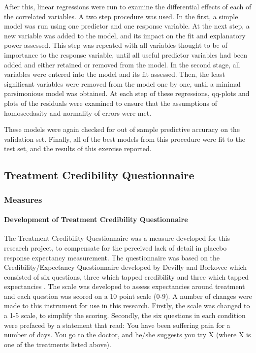After this, linear regressions were run to examine the differential effects of each of the correlated variables. A two step procedure was used. In the first, a simple model was run using one predictor and one response variable. At the next step, a new variable was added to the model, and its impact on the fit and explanatory power assessed. This step was repeated with all variables thought to be of importance to the response variable, until all useful predictor variables had been added and either retained or removed from the model. In the second stage, all variables were entered into the model and its fit assessed. Then, the least significant variables were removed from the model one by one, until a minimal parsimonious model was obtained. At each step of these regressions, qq-plots and plots of the residuals were examined to ensure that the assumptions of homoscedasity and normality of errors were met.

These models were again checked for out of sample predictive accuracy on the validation set. Finally, all of the best models from this procedure were fit to the test set, and the results of this exercise reported. 

\subsection{Treatment Credibility Questionnaire}

\subsubsection{Measures}

\paragraph{Development of Treatment Credibility Questionnaire}

The Treatment Credibility Questionnaire was a measure developed for this research project, to compensate for the perceived lack of detail in placebo response expectancy measurement. The questionnaire was based on the Credibility/Expectancy Questionnaire developed by Devilly and Borkovec which consisted of six questions, three which tapped credibility and three which tapped expectancies \cite{Devilly2000}. The scale was developed to assess expectancies around treatment and each question was scored on a 10 point scale (0-9). A number of changes were made to this instrument for use in this research. Firstly, the scale was changed to a 1-5 scale, to simplify the scoring. Secondly, the six questions in each condition were prefaced by a statement that read: You have been suffering pain for a number of days. You go to the doctor, and he/she suggests you try X (where X is one of the treatments listed above). 

